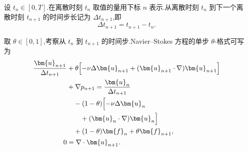 \begin{note}[记号约定]
\label{note:time-discretization-notation}
设 $t_n\in[0,T]$.在离散时刻 $t_n$ 取值的量用下标 $n$ 表示.从离散时刻 $t_n$ 到下一个离散时刻 $t_{n+1}$ 的时间步长记为 $\Delta t_{n+1}$,即
\[
  \Delta t_{n+1}=t_{n+1}-t_n.
\]
\end{note}

\begin{note}
\label{note:one-step-theta-scheme}
取 $\theta\in[0,1]$,考察从 $t_n$ 到 $t_{n+1}$ 的时间步.Navier--Stokes 方程的单步 $\theta$-格式可写为
\begin{equation}\label{eq:theta-scheme-one-step}
\begin{aligned}
  \frac{\bm{u}_{n+1}}{\Delta t_{n+1}}
  &+\theta\Bigl[-\nu\Delta\bm{u}_{n+1}
       +(\bm{u}_{n+1}\cdot\nabla)\bm{u}_{n+1}\Bigr]\\
  &+\nabla p_{n+1}
       =\frac{\bm{u}_n}{\Delta t_{n+1}}\\
  &\quad-(1-\theta)\Bigl[-\nu\Delta\bm{u}_n\\
  &\qquad+(\bm{u}_n\cdot\nabla)\bm{u}_n\Bigr]\\
  &\quad+(1-\theta)\bm{f}_n+\theta\bm{f}_{n+1},\\
  0&=\nabla\cdot\bm{u}_{n+1}.
\end{aligned}
\end{equation}
\end{note}

